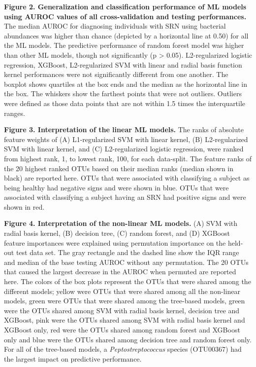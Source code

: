 \documentclass[11pt,]{article}
\begin{document}
\hfill\break

\textbf{Figure 2. Generalization and classification performance of ML
models using AUROC values of all cross-validation and testing
performances.} The median AUROC for diagnosing individuals with SRN
using bacterial abundances was higher than chance (depicted by a
horizontal line at 0.50) for all the ML models. The predictive
performance of random forest model was higher than other ML models,
though not significantly (p \textgreater{} 0.05). L2-regularized
logistic regression, XGBoost, L2-regularized SVM with linear and radial
basis function kernel performances were not significantly different from
one another. The boxplot shows quartiles at the box ends and the median
as the horizontal line in the box. The whiskers show the farthest points
that were not outliers. Outliers were defined as those data points that
are not within 1.5 times the interquartile ranges.

\hfill\break

\textbf{Figure 3. Interpretation of the linear ML models.} The ranks of
absolute feature weights of (A) L1-regularized SVM with linear kernel,
(B) L2-regularized SVM with linear kernel, and (C) L2-regularized
logistic regression, were ranked from highest rank, 1, to lowest rank,
100, for each data-split. The feature ranks of the 20 highest ranked
OTUs based on their median ranks (median shown in black) are reported
here. OTUs that were associated with classifying a subject as being
healthy had negative signs and were shown in blue. OTUs that were
associated with classifying a subject having an SRN had positive signs
and were shown in red.

\hfill\break

\textbf{Figure 4. Interpretation of the non-linear ML models.} (A) SVM
with radial basis kernel, (B) decision tree, (C) random forest, and (D)
XGBoost feature importances were explained using permutation importance
on the held-out test data set. The gray rectangle and the dashed line
show the IQR range and median of the base testing AUROC without any
permutation. The 20 OTUs that caused the largest decrease in the AUROC
when permuted are reported here. The colors of the box plots represent
the OTUs that were shared among the different models; yellow were OTUs
that were shared among all the non-linear models, green were OTUs that
were shared among the tree-based models, green were the OTUs shared
among SVM with radial basis kernel, decision tree and XGBoost, pink were
the OTUs shared among SVM with radial basis kernel and XGBoost only, red
were the OTUs shared among random forest and XGBoost only and blue were
the OTUs shared among decision tree and random forest only. For all of
the tree-based models, a \emph{Peptostreptococcus} species (OTU00367)
had the largest impact on predictive performance.
\end{document}
